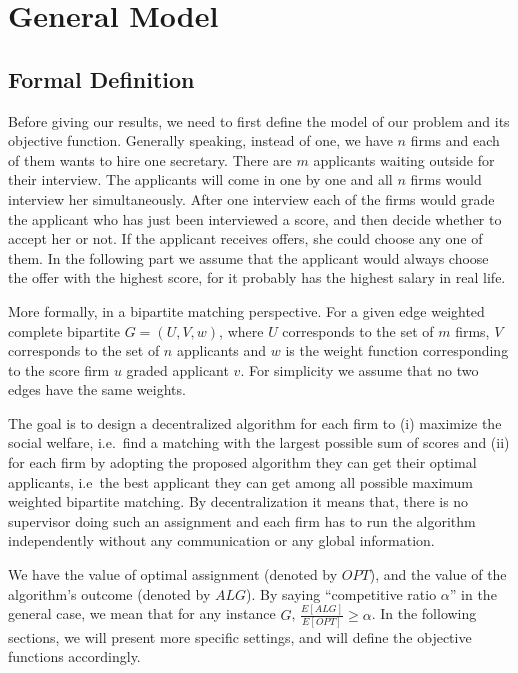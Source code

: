 \chapter{General Model}

\section{Formal Definition}

Before giving our results, we need to first define the model
of our problem and its objective function.
Generally speaking, instead of one, we have $n$ firms and each of them
wants to hire one secretary. There are $m$ applicants waiting outside
for their interview. The applicants will come in one by one and all
$n$ firms would interview her simultaneously. After one interview each
of the firms would grade the applicant who has just been interviewed
a score, and then decide whether to accept her or not. If the applicant
receives offers, she could choose any one of them.
In the following part we assume that the applicant would always choose the
offer with the highest score, for it probably has the highest salary
in real life.

More formally, in a bipartite matching perspective.
For a given edge weighted complete bipartite $G = (U, V, w)$,
where $U$ corresponds to the set of $m$ firms, 
$V$ corresponds to the set of $n$ applicants
and $w$ is the weight function corresponding to the score firm $u$
graded applicant $v$.
For simplicity we assume that no two edges have the same weights.

The goal is to design a decentralized algorithm for each firm to
(i) maximize the social welfare, i.e.\ find a matching with the 
largest possible sum of scores and (ii) for each firm by adopting the
proposed algorithm they can get their optimal applicants,
i.e\ the best applicant they can get among all possible maximum weighted
bipartite matching. By decentralization it means that, there is no
supervisor doing such an assignment and each firm has
to run the algorithm independently without any communication or
any global information.

We have the value of optimal assignment (denoted by $OPT$), 
and the value of the algorithm's outcome (denoted by $ALG$).
By saying ``competitive ratio $\alpha$'' in the general case, 
we mean that for any instance $G$, $\frac{E[ALG]}{E[OPT]} \ge \alpha$.
In the following sections, we will present more specific settings, 
and will define the objective functions accordingly.

